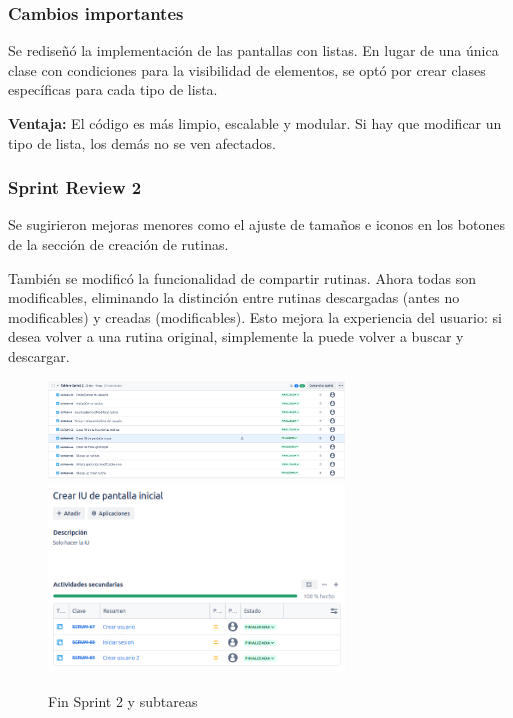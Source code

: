 \subsubsection*{Cambios importantes}
Se redise\~n\'o la implementaci\'on de las pantallas con listas. En lugar de una \'unica clase con condiciones para la visibilidad de elementos, se opt\'o por crear clases espec\'ificas para cada tipo de lista.

\textbf{Ventaja:} El c\'odigo es m\'as limpio, escalable y modular. Si hay que modificar un tipo de lista, los dem\'as no se ven afectados.

\subsubsection*{Sprint Review 2}
Se sugirieron mejoras menores como el ajuste de tama\~nos e iconos en los botones de la secci\'on de creaci\'on de rutinas.

Tambi\'en se modific\'o la funcionalidad de compartir rutinas. Ahora todas son modificables, eliminando la distinci\'on entre rutinas descargadas (antes no modificables) y creadas (modificables). Esto mejora la experiencia del usuario: si desea volver a una rutina original, simplemente la puede volver a buscar y descargar.

\begin{figure}[h!]
  \centering
  \includegraphics[width=0.7\textwidth]{fotos/PostSprint2.png}
  \includegraphics[width=0.7\textwidth]{fotos/SubListPost2.png}
  \caption{Fin Sprint 2 y subtareas}
  \label{fig:post_sprint2}
\end{figure}



